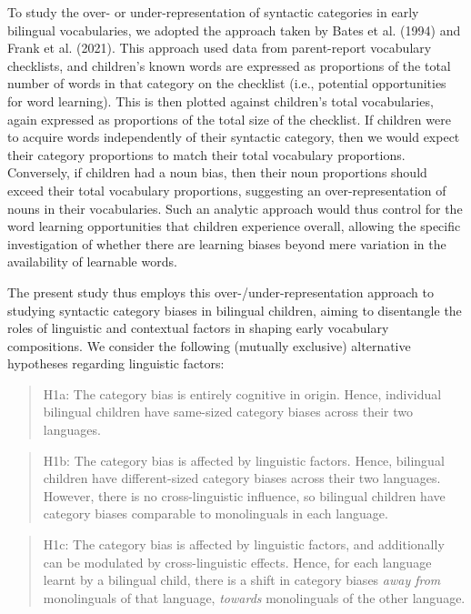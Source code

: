 \documentclass[10pt, letterpaper]{article}
\begin{document}
To study the over- or under-representation of syntactic categories in
early bilingual vocabularies, we adopted the approach taken by Bates et
al. (1994) and Frank et al. (2021). This approach used data from
parent-report vocabulary checklists, and children's known words are
expressed as proportions of the total number of words in that category
on the checklist (i.e., potential opportunities for word learning). This
is then plotted against children's total vocabularies, again expressed
as proportions of the total size of the checklist. If children were to
acquire words independently of their syntactic category, then we would
expect their category proportions to match their total vocabulary
proportions. Conversely, if children had a noun bias, then their noun
proportions should exceed their total vocabulary proportions, suggesting
an over-representation of nouns in their vocabularies. Such an analytic
approach would thus control for the word learning opportunities that
children experience overall, allowing the specific investigation of
whether there are learning biases beyond mere variation in the
availability of learnable words.

The present study thus employs this over-/under-representation approach
to studying syntactic category biases in bilingual children, aiming to
disentangle the roles of linguistic and contextual factors in shaping
early vocabulary compositions. We consider the following (mutually
exclusive) alternative hypotheses regarding linguistic factors:

\begin{quote}
H1a: The category bias is entirely cognitive in origin. Hence,
individual bilingual children have same-sized category biases across
their two languages.
\end{quote}

\begin{quote}
H1b: The category bias is affected by linguistic factors. Hence,
bilingual children have different-sized category biases across their two
languages. However, there is no cross-linguistic influence, so bilingual
children have category biases comparable to monolinguals in each
language.
\end{quote}

\begin{quote}
H1c: The category bias is affected by linguistic factors, and
additionally can be modulated by cross-linguistic effects. Hence, for
each language learnt by a bilingual child, there is a shift in category
biases \emph{away from} monolinguals of that language, \emph{towards}
monolinguals of the other language.
\end{quote}
\end{document}

